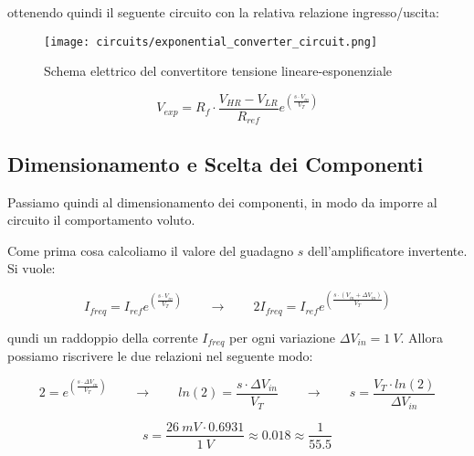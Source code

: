 ottenendo quindi il seguente circuito con la relativa relazione ingresso/uscita:

\begin{figure}[H]
    \centering
    \texttt{[image: circuits/exponential\_converter\_circuit.png]}
    \caption{Schema elettrico del convertitore tensione lineare-esponenziale}
    \label{exponential_converter_circuit}
\end{figure}

\begin{displaymath}
    V_{exp}=R_f\cdot \frac{V_{HR}-V_{LR}}{R_{ref}}e^{\left(\frac{s\cdot V_{in}}{V_T}\right)}
\end{displaymath}


\subsection*{Dimensionamento e Scelta dei Componenti}


Passiamo quindi al dimensionamento dei componenti, in modo da imporre al circuito il
comportamento voluto.

Come prima cosa calcoliamo il valore del guadagno $s$ dell'amplificatore invertente.
Si vuole:

\begin{displaymath}
    I_{freq}=I_{ref}e^{\left(\frac{s\cdot V_{in}}{V_T}\right)}
    \qquad
    \rightarrow
    \qquad
    2I_{freq}=I_{ref}e^{\left(\frac{s\cdot(V_{in}+\Delta V_{in})}{V_T}\right)}
\end{displaymath}

qundi un raddoppio della corrente $I_{freq}$ per ogni variazione $\Delta V_{in}=1\ V$.
Allora possiamo riscrivere le due relazioni nel seguente modo:

\begin{displaymath}
    2=e^{\left(\frac{s\cdot\Delta V_{in}}{V_T}\right)}
    \qquad
    \rightarrow
    \qquad
    ln(2)=\frac{s\cdot\Delta V_{in}}{V_T}
    \qquad
    \rightarrow
    \qquad
    s=\frac{V_T\cdot ln(2)}{\Delta V_{in}}
\end{displaymath}

\begin{displaymath}
    s=\frac{26\ mV\cdot 0.6931}{1\ V}\approx0.018\approx\frac{1}{55.5}
\end{displaymath}

